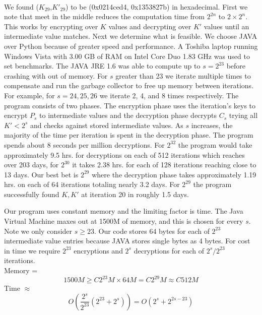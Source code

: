 \documentclass[11pt]{article}
\begin{document}
\paragraph{}
We found ($K_{29}$,$K'_{29}$) to be (0x0214ced4, 0x1353827b) in hexadecimal. First we note 
that meet in the middle reduces the computation time
from $2^{2n}$ to $2\times2^n$. This works by encrypting over
$K$ values and decrypting over $K'$ values until an intermediate value
matches. Next we determine what is feasible. We choose JAVA over Python
because of greater speed and performance. A Toshiba laptop running
Windows Vista with 3.00 GB of RAM on Intel Core Duo 1.83 GHz was used to set
benchmarks. The JAVA JRE 1.6 was able to compute up to $s = 2^{23}$ before
crashing with out of memory. For $s$ greater than 23 we iterate multiple
times to compensate and run the garbage collector to free up memory
between iterations. For example, for $s = 24,25,26$ we iterate 2, 4, and 8
times respectively. The program consists of two phases. The encryption
phase uses the iteration's keys to encrypt $P_s$ to intermediate values and the
decryption phase decrypts $C_s$ trying all $K' < 2^s$ and checks against
stored intermediate values. As $s$ increases, the majority of the time
per iteration is spent in the decryption phase. The program spends about
8 seconds per million decryptions. For $2^{32}$ the program would take
approximately 9.5 hrs. for decryptions on each of 512 iterations which reaches
over 203 days, for $2^{30}$ it takes 2.38 hrs. for each of 128
iterations reaching close to 13 days. Our best bet is $2^{29}$ where the
decryption phase takes approximately 1.19 hrs. on each of 64 iterations
totaling nearly 3.2 days. For $2^{29}$ the program successfully found
$K,K'$ at iteration 20 in roughly 1.5 days. 

Our program uses constant memory and the
limiting factor is time. The Java Virtual Machine maxes out at 1500M of
memory, and this is chosen for every $s$. Note we only consider $s \geq
23$. Our code stores 64 bytes for each of $2^{23}$ intermediate value
entries because JAVA stores single bytes as 4 bytes. 
For cost in time we require $2^{23}$ encryptions and $2^s$ decryptions
for each of $2^s/2^{23}$ iterations. \\

Memory = 
\begin{equation*}
1500M  \geq C2^{23}M \times 64M = C2^{29}M \approx C512M
\end{equation*}
Time $\approx$ 
\begin{equation*}
O(\frac{2^s}{2^{23}}(2^{23} + 2^s)) = O(2^s + 2^{2s-23})
\end{equation*}
\end{document}
